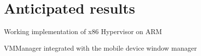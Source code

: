 \section{Anticipated results}
	\begin{itemize*}
	\item Working implementation of x86 Hypervisor on ARM
	\item VMManager integrated with the mobile device window manager 
	\end{itemize*}

